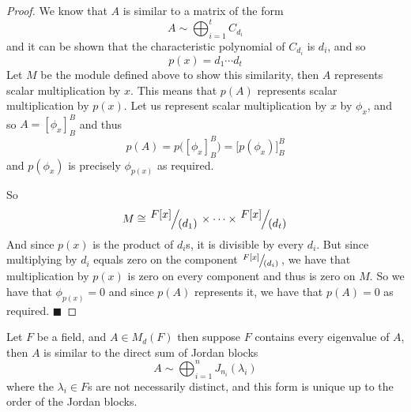 \documentclass[10pt]{article}
\def\qed{%
    \ifmmode%
        \eqno\blacksquare%
    \else%
        \hskip1cm\hbox{}\hfill$\blacksquare$%
    \fi%
}
\begin{document}
\begin{proof}

    We know that $A$ is similar to a matrix of the form
    \[ A\sim\bigoplus_{i=1}^t C_{d_i} \]
    and it can be shown that the characteristic polynomial of $C_{d_i}$ is $d_i$, and so
    \[ p(x) = d_1\cdots d_t \]
    Let $M$ be the module defined above to show this similarity, then $A$ represents scalar multiplication by $x$.
    This means that $p(A)$ represents scalar multiplication by $p(x)$.
    Let us represent scalar multiplication by $x$ by $\phi_x$, and so $A=[\phi_x]^B_B$ and thus
    \[ p(A) = p\bigl([\phi_x]^B_B\bigr) = \bigl[p(\phi_x)\bigr]^B_B \]
    and $p(\phi_x)$ is precisely $\phi_{p(x)}$ as required.

    So
    \[ M\cong\slfrac{F[x]}{(d_1)}\times\cdots\times\slfrac{F[x]}{(d_t)} \]
    And since $p(x)$ is the product of $d_i$s, it is divisible by every $d_i$.
    But since multiplying by $d_i$ equals zero on the component $\slfrac{F[x]}{(d_i)}$, we have that multiplication by $p(x)$ is zero on every component and thus is zero on $M$.
    So we have that $\phi_{p(x)}=0$ and since $p(A)$ represents it, we have that $p(A)=0$ as required.
    \qed

\end{proof}

\begin{thrm*}

    Let $F$ be a field, and $A\in M_d(F)$ then suppose $F$ contains every eigenvalue of $A$, then $A$ is similar to the direct sum of Jordan blocks
    \[ A \sim \bigoplus_{i=1}^n J_{n_i}(\lambda_i) \]
    where the $\lambda_i\in F$s are not necessarily distinct, and this form is unique up to the order of the Jordan blocks.

\end{thrm*}
\end{document}
